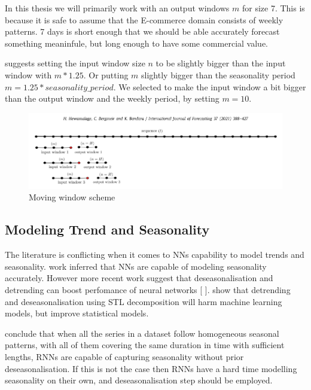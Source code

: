 In this thesis we will primarily work with an output windows $m$ for size 7.
This is because it is safe to assume that the E-commerce domain consists of weekly patterns.
7 days is short enough that we should be able accurately forecast something meaninfule,
but long enough to have some commercial value.

\cite{Hewamalage2021} suggests setting the input window size $n$ to be slightly
bigger than the input window with $m * 1.25$. Or putting $m$ slightly bigger than
the seasonality period $m = 1.25 * seasonality\_period$.
We selected to make the input window a bit bigger than the output window and the weekly
period, by setting $m = 10$.
\begin{figure}[h!]
  \centering
  \includegraphics[width=\textwidth]{./figs/illustrations/moving_window_illustration.png}
  \hfill
  \caption{Moving window scheme \citep{Hewamalage2021}}
  \label{fig:dataset:moving_window_scheme}
\end{figure}



\subsection{Modeling Trend and Seasonality}
\label{section:Data:Preprocessing:trend-and-seasonality}


The literature is conflicting when it comes to NNs capability to
model trends and seasonality. \cite{Sharda1992} work inferred that NNs are
capable of modeling seasonality accurately.
However more recent work suggest that deseasonalisation and
detrending can boost perfomance of neural networks [\cite{Zhang2005} \cite{Smyl2020}].
\cite{Ouyang2021} show that detrending and deseasonalisation using STL decomposition
will harm machine learning models, but improve statistical models.

\cite{Hewamalage2021} conclude that when all the series in a dataset follow
homogeneous seasonal patterns, with all of them covering the same duration in time
with sufficient lengths, RNNs are capable of capturing seasonality
without prior deseasonalisation.
If this is not the case then RNNs have a hard time modelling
seasonality on their own, and deseasonalisation step should be employed.

